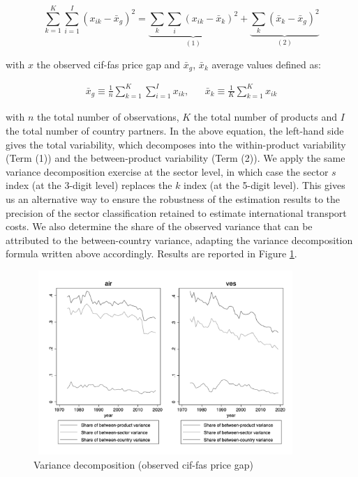 \documentclass[11pt,twoside, authoryear]{elsarticle}
\begin{document}
$$\sum_{k=1}^K \sum_{i=1}^I \left(x_{ik} - \bar{x}_g  \right)^2 = \underbrace{\sum_k \sum_i \left(x_{ik} - \bar{x}_k  \right)^2}_{(1)} + \underbrace{\sum_k \left(\bar{x}_{k} - \bar{x}_g  \right)^2}_{(2)}$$

with $x$ the observed cif-fas price gap and $\bar{x}_g$, $\bar{x}_k$ average values defined as:

\begin{eqnarray*}
\bar{x}_g \equiv \frac{1}{n} \sum_{k=1}^K \sum_{i=1}^I x_{ik},&& \bar{x}_k \equiv \frac{1}{K}\sum_{k=1}^K x_{ik}
\end{eqnarray*}

\noindent with $n$ the total number of observations, $K$ the total number of products and $I$ the total number of country partners. In the above equation, the left-hand side gives the total variability, which decomposes into the within-product variability (Term (1)) and the between-product variability (Term (2)).
We apply the same variance decomposition exercise at the sector level, in which case the sector $s$ index (at the 3-digit level) replaces the $k$ index (at the 5-digit level).
This gives us an alternative way to ensure the robustness of the estimation results to the precision of  the sector classification retained to estimate international transport costs.
We also determine the share of the observed variance that can be attributed to the between-country variance, adapting the variance decomposition formula written above accordingly.
Results are reported in Figure \ref{fig:decomp_variance}.

\begin{figure}[htbp]
\caption{Variance decomposition (observed cif-fas price gap)}
\label{fig:decomp_variance}
\begin{center}
\includegraphics[width=10cm, height=7cm]{../Decomposition_de_la_variance_a_la_mimine_ss_val_ext.png}
\end{center}
\end{figure}
\end{document}
